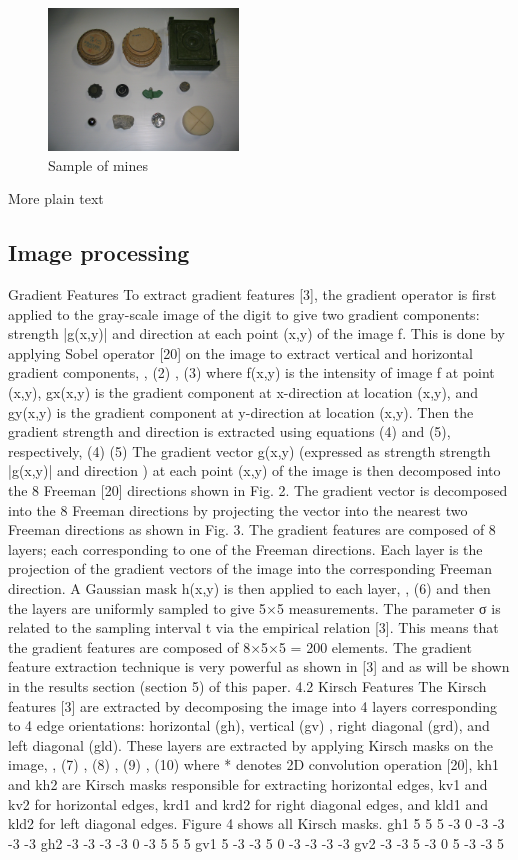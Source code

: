 \documentclass[conference]{IEEEtran}
\begin{document}
 \begin{figure}
\centering
\label{fig:mineshapes}
\includegraphics[width=0.45\textwidth]{images/MineShapes.jpg}
 \caption{ Sample of mines  }
\end{figure}


More plain text
\subsection{Image processing}


Gradient Features
To extract gradient features [3], the gradient operator is first applied to the gray-scale image of the digit to give two gradient components: strength |g(x,y)| and direction  at each point (x,y) of the image f. This is done by applying Sobel operator [20] on the image to extract vertical and horizontal gradient components,
 ,	(2)
 ,	(3)
where f(x,y) is the intensity of image f at point (x,y), gx(x,y) is the gradient component at x-direction at location (x,y), and gy(x,y) is the gradient component at y-direction at location (x,y).
Then the gradient strength and direction is extracted using equations (4) and (5), respectively,
 		(4)
 			(5)
The gradient vector g(x,y) (expressed as strength strength |g(x,y)| and direction  ) at each point (x,y) of the image is then decomposed into the 8 Freeman [20] directions shown in Fig. 2. The gradient vector is decomposed into the 8 Freeman directions by projecting the vector into the nearest two Freeman directions as shown in Fig. 3.
The gradient features are composed of 8 layers; each corresponding to one of the Freeman directions. Each layer is the projection of the gradient vectors of the image into the corresponding Freeman direction.
A Gaussian mask h(x,y) is then applied to each layer,
 ,		(6)
and then the layers are uniformly sampled to give 5×5 measurements. The parameter σ is related to the sampling interval t via the empirical relation  [3]. This means that the gradient features are composed of 8×5×5 = 200 elements. The gradient feature extraction technique is very powerful as shown in [3] and as will be shown in the results section (section 5) of this paper.
4.2 Kirsch Features
The Kirsch features [3] are extracted by decomposing the image into 4 layers corresponding to 4 edge orientations: horizontal (gh), vertical (gv) , right diagonal (grd), and left diagonal (gld). These layers are extracted by applying Kirsch masks on the image,
 ,		(7)
 ,		(8)
 ,	(9)
 ,	(10)
where * denotes 2D convolution operation [20], kh1 and kh2 are Kirsch masks responsible for extracting horizontal edges, kv1 and kv2 for horizontal edges, krd1 and krd2 for right diagonal edges, and kld1 and kld2 for left diagonal edges. Figure 4 shows all Kirsch masks.
gh1
5	5	5
-3	0	-3
-3	-3	-3
	gh2
-3	-3	-3
-3	0	-3
5	5	5
	gv1
5	-3	-3
5	0	-3
-3	-3	-3
	gv2
-3	-3	5
-3	0	5
-3	-3	5
\end{document}

